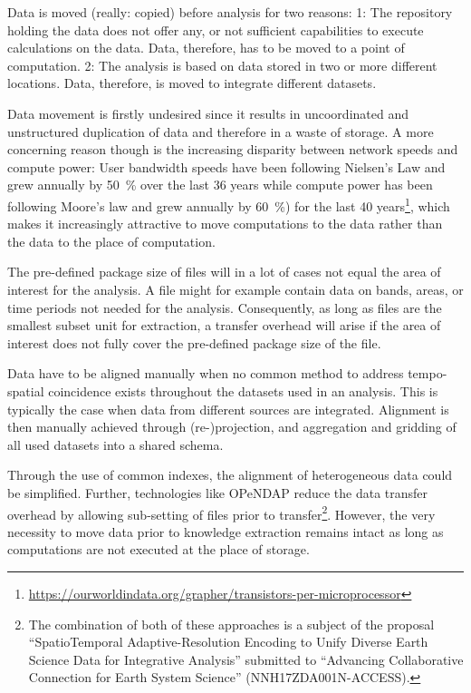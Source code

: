 \documentclass[a4paper,10pt]{article}
\begin{document}
Data is moved (really: copied) before analysis for two reasons: 
1: The repository holding the data does not offer any, or not sufficient capabilities to execute calculations on the data. Data, therefore, has to be moved to a point of computation. 
2: The analysis is based on data stored in two or more different locations. Data, therefore, is moved to integrate different datasets. 

Data movement is firstly undesired since it results in uncoordinated and unstructured duplication of data and therefore in a waste of storage.
A more concerning reason though is the increasing disparity between network speeds and compute power: User bandwidth speeds have been following Nielsen's Law \citep{Nielsen1998} and grew annually by \SI{50}{\percent} over the last 36 years while compute power has been following Moore's law \citep{Moore1975} and grew annually by \SI{60}{\percent}) for the last 40 years\footnote{\url{https://ourworldindata.org/grapher/transistors-per-microprocessor}}, which makes it increasingly attractive to move computations to the data rather than the data to the place of computation.

The pre-defined package size of files will in a lot of cases not equal the area of interest for the analysis. A file might for example contain data on bands, areas, or time periods not needed for the analysis. Consequently, as long as files are the smallest subset unit for extraction, a transfer overhead will arise if the area of interest does not fully cover the pre-defined package size of the file.

Data have to be aligned manually when no common method to address tempo-spatial coincidence exists throughout the datasets used in an analysis. This is typically the case when data from different sources are integrated. Alignment is then manually achieved through (re-)projection, and aggregation and gridding of all used datasets into a shared schema.

Through the use of common indexes, the alignment of heterogeneous data could be simplified. 
Further, technologies like \gls{OPeNDAP} reduce the data transfer overhead by allowing
sub-setting of files prior to transfer\footnote{The combination of both of these approaches is a subject of the proposal ``SpatioTemporal Adaptive-Resolution Encoding to Unify Diverse Earth Science Data for Integrative Analysis'' submitted to ``Advancing Collaborative Connection for Earth System Science'' (NNH17ZDA001N-ACCESS).}.
However, the very necessity to move data prior to knowledge extraction remains intact as long as computations are not executed at the place of storage.
\end{document}

